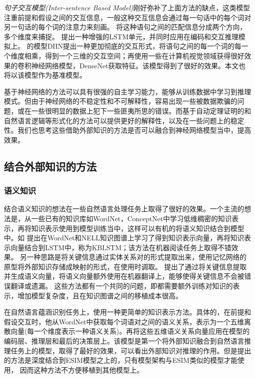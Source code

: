 \documentclass[UTF8,11pt,a4paper,nofonts]{ctexart}
\numberwithin{equation}{section}
\begin{document}
\textit{句子交互模型(Inter-sentence Based Model)}\cite{Wang2017Bilateral, Sha2016ReadingAT, chen2017enhanced, yichen2018nli}刚好弥补了上面方法的缺点，这类模型注重前提和假设之间的交互信息，一般这种交互信息会通过每一句话中的每个词对另一句话的每个词的注意力来刻画。
\cite{Wang2017Bilateral}将这种语句之间的匹配信息分成两个方向，多个维度来捕捉。
\cite{chen2017enhanced}提出一种增强的LSTM单元，并同时应用在编码和交互推理模拟上。
\cite{yichen2018nli}的模型DIIN提出一种更加彻底的交互形式，将语句之间的每一个词的每一个维度相乘，得到一个三维的交互空间；再使用一些在计算机视觉领域获得很好效果的卷积神经网络模型，DenseNet\cite{Huang2017DenselyCC}获取特征。该模型得到了很好的效果。本文也将以该模型作为基准模型。

基于神经网络的方法可以具有很强的自主学习能力，能够从训练数据中学习到推理模式。但由于神经网络的不稳定性和不可解释性，容易出现一些被数据欺骗的问题，或在一些很明显的数据上犯下一些匪夷所思的错误。而基于自动定理证明的和自然语言逻辑等形式化的方法可以提供更好的解释性，以及在一些问题上的稳定性。我们也思考这些借助外部知识的方法是否可以融合到神经网络模型当中，提高效果。




\subsection{结合外部知识的方法}

\subsubsection{语义知识}

结合语义知识的想法在一些自然语言处理任务上取得了很好的效果。一个主流的想法是，从一些已有的知识库如WordNet，ConceptNet中学习低维稠密的知识表示，再将知识表示使用到模型训练当中，这样可以有机的将语义知识结合到模型中。如
\cite{Yang2017LeveragingKB}提出在WordNet和NELL知识图谱上学习了得到知识表示向量，再将知识表示向量结合到LSTM中，称为KBLSTM；该方法在机器阅读任务上取得不错效果。
另一种思路是将关键信息通过实体关系对的形式提取出来，使用记忆网络的原型将外部知识存储成映射的形式，在使用时调取。
\cite{Shi2016KnowledgeBasedSE}提出了通过将关键信息提取并生成语义向量，将语义向量额外使用在机器翻译上，能够使得关键信息不会被错误翻译或遗漏。
这些方法都有一个共同的问题，即都需要额外训练对知识的表示，增加模型复杂度，且在知识图谱之间的移植成本很高。

在自然语言蕴涵识别任务上，\cite{Chen2017NaturalLI}使用一种更简单的知识表示方法。具体的，在前提和假设交互时，他从WordNet中获取每个词语对之间的语义关系，表示为一个五维离散向量(每一个维度表示一种语义关系)。再将这些五维语义关系向量应用在模型的编码层、推理层和最后的决策层上。该模型是第一个将外部知识融合到自然语言推理任务上的模型，取得了最好的效果，可以看出外部知识对推理的作用。但是\cite{Chen2017NaturalLI}提出的方法是深度结合到ESIM模型之上的，只有模型架构与ESIM类似的模型才能使用，
因而这种方法不方便移植到其他模型上。
\end{document}
